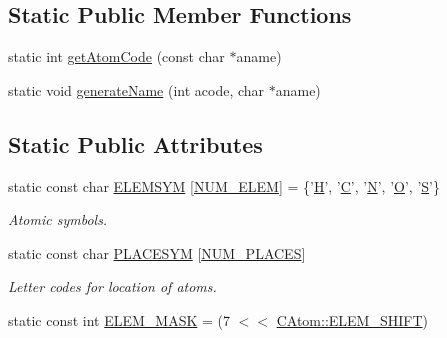 \subsection*{Static Public Member Functions}
\begin{DoxyCompactItemize}
\item 
static int \hyperlink{classCAtom_a5208b057db97f1c98b3b8fd973a95412}{get\-Atom\-Code} (const char $\ast$aname)
\item 
static void \hyperlink{classCAtom_ac31a8af47f25e335803afe6d356a0112}{generate\-Name} (int acode, char $\ast$aname)
\end{DoxyCompactItemize}
\subsection*{Static Public Attributes}
\begin{DoxyCompactItemize}
\item 
static const char \hyperlink{classCAtom_a4c2f1a2299fb0ffbdb1307f744591baf}{E\-L\-E\-M\-S\-Y\-M} \mbox{[}\hyperlink{pdb_8h_a39e506e6b2b0a7caa66b2ad2dba6ef24}{N\-U\-M\-\_\-\-E\-L\-E\-M}\mbox{]} = \{'\hyperlink{classCAtom_a79e729b143961179c43939392d704848abf99f6f070bd255d3d610b6ec34f13b2}{H}', '\hyperlink{classCAtom_a79e729b143961179c43939392d704848a6e700b53b49716ee00aa07e562cd7f43}{C}', '\hyperlink{classCAtom_a79e729b143961179c43939392d704848ad8dcecc0b02940db05ebb15dd382a225}{N}', '\hyperlink{classCAtom_a79e729b143961179c43939392d704848a5031f6d781302d5217fa84699f5a6439}{O}', '\hyperlink{classCAtom_a79e729b143961179c43939392d704848a2fedd9d99a80c0ce9141da1e46aec6c2}{S}'\}
\begin{DoxyCompactList}\small\item\em Atomic symbols. \end{DoxyCompactList}\item 
static const char \hyperlink{classCAtom_af438732d59641738cfea16a7dd895dea}{P\-L\-A\-C\-E\-S\-Y\-M} \mbox{[}\hyperlink{pdb_8h_a97e57794bbd80e909807f0ac940cc4f7}{N\-U\-M\-\_\-\-P\-L\-A\-C\-E\-S}\mbox{]}
\begin{DoxyCompactList}\small\item\em Letter codes for location of atoms. \end{DoxyCompactList}\item 
static const int \hyperlink{classCAtom_aa97b0aef40ff8616ad51269c3bd50070}{E\-L\-E\-M\-\_\-\-M\-A\-S\-K} = (7 $<$$<$ \hyperlink{classCAtom_a8d1a901dcaeab90596ffacac7bc04f3d}{C\-Atom\-::\-E\-L\-E\-M\-\_\-\-S\-H\-I\-F\-T})
\item 
$$
\end{DoxyCompactItemize}
